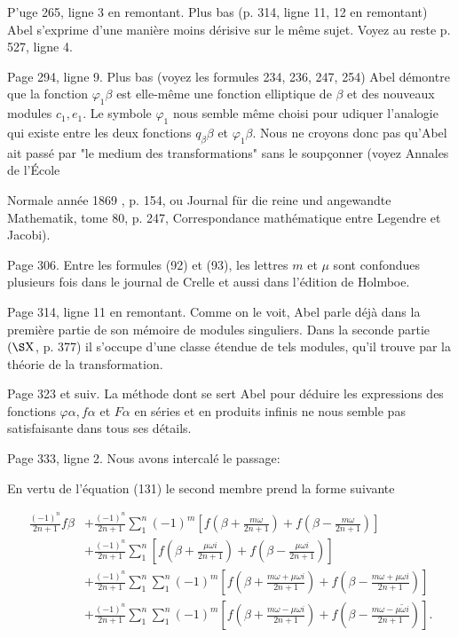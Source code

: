 \documentclass{article}
\begin{document}
P'uge 265, ligne 3 en remontant. Plus bas (p. 314, ligne 11, 12 en remontant) Abel s'exprime d'une manière moins dérisive sur le même sujet. Voyez au reste p. 527, ligne 4.

Page 294, ligne 9. Plus bas (voyez les formules 234, 236, 247, 254) Abel démontre que la fonction \(\varphi_{1} \beta\) est elle-même une fonction elliptique de \(\beta\) et des nouveaux modules \(c_{1}, e_{1}\). Le symbole \(\varphi_{1}\) nous semble même choisi pour udiquer l'analogie qui existe entre les deux fonctions \(q_{\beta} \beta\) et \(\varphi_{1} \beta\). Nous ne croyons donc pas qu'Abel ait passé par "le medium des transformations" sans le soupçonner (voyez Annales de l'École

Normale année 1869 , p. 154, ou Journal für die reine und angewandte Mathematik, tome 80, p. 247, Correspondance mathématique entre Legendre et Jacobi).

Page 306. Entre les formules (92) et (93), les lettres \(m\) et \(\mu\) sont confondues plusieurs fois dans le journal de Crelle et aussi dans l'édition de Holmboe.

Page 314, ligne 11 en remontant. Comme on le voit, Abel parle déjà dans la première partie de son mémoire de modules singuliers. Dans la seconde partie \((\S \mathrm{X}\), p. 377) il s'occupe d'une classe étendue de tels modules, qu'il trouve par la théorie de la transformation.

Page 323 et suiv. La méthode dont se sert Abel pour déduire les expressions des fonctions \(\varphi \alpha, f \alpha\) et \(F \alpha\) en séries et en produits infinis ne nous semble pas satisfaisante dans tous ses détails.

Page 333, ligne 2. Nous avons intercalé le passage:

En vertu de l'équation (131) le second membre prend la forme suivante

\[
\begin{aligned}
\frac{(-1)^{n}}{2 n+1} f \beta & +\frac{(-1)^{n}}{2 n+1} \sum_{1}^{n}(-1)^{m}\left[f\left(\beta+\frac{m \omega}{2 n+1}\right)+f\left(\beta-\frac{m \omega}{2 n+1}\right)\right] \\
& +\frac{(-1)^{n}}{2 n+1} \sum_{1}^{n}\left[f\left(\beta+\frac{\mu \omega i}{2 n+1}\right)+f\left(\beta-\frac{\mu \omega i}{2 n+1}\right)\right] \\
& +\frac{(-1)^{n}}{2 n+1} \sum_{1}^{n} \sum_{1}^{n}(-1)^{m}\left[f\left(\beta+\frac{m \omega+\mu \omega i}{2 n+1}\right)+f\left(\beta-\frac{m \omega+\mu \omega i}{2 n+1}\right)\right] \\
& +\frac{(-1)^{n}}{2 n+1} \sum_{1}^{n} \sum_{1}^{n}(-1)^{m}\left[f\left(\beta+\frac{m \omega-\mu \omega i}{2 n+1}\right)+f\left(\beta-\frac{m \omega-\mu \tilde{\omega} i}{2 n+1}\right)\right] .
\end{aligned}
\]
\end{document}
